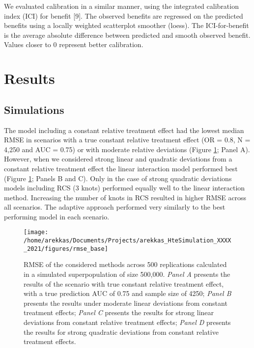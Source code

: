 \documentclass{article}
\begin{document}
We evaluated calibration in a similar manner, using the integrated
calibration index (ICI) for benefit {[}9{]}. The observed benefits are
regressed on the predicted benefits using a locally weighted scatterplot
smoother (loess). The ICI-for-benefit is the average absolute difference
between predicted and smooth observed benefit. Values closer to \(0\)
represent better calibration.

\hypertarget{results}{%
\section{Results}\label{results}}

\hypertarget{simulations}{%
\subsection{Simulations}\label{simulations}}

The model including a constant relative treatment effect had the lowest
median RMSE in scenarios with a true constant relative treatment effect
(OR = 0.8, N = 4,250 and AUC = 0.75) or with moderate relative
deviations (Figure \ref{fig:rmsebase}; Panel A). However, when we
considered strong linear and quadratic deviations from a constant
relative treatment effect the linear interaction model performed best
(Figure \ref{fig:rmsebase}; Panels B and C). Only in the case of strong
quadratic deviations models including RCS (3 knots) performed equally
well to the linear interaction method. Increasing the number of knots in
RCS resulted in higher RMSE across all scenarios. The adaptive approach
performed very similarly to the best performing model in each scenario.

\begin{figure}
\texttt{[image: /home/arekkas/Documents/Projects/arekkas\_HteSimulation\_XXXX\_2021/figures/rmse\_base]} \caption{RMSE of the considered methods across 500 replications calculated in a simulated superpopulation of size 500,000. \textit{Panel A} presents the results of the scenario with true constant relative treatment effect, with a true prediction AUC of 0.75 and sample size of 4250; \textit{Panel B} presents the results under moderate linear deviations from constant treatment effects; \textit{Panel C} presents the results for strong linear deviations from constant relative treatment effects; \textit{Panel D} presents the results for strong quadratic deviations from constant relative treatment effects.}\label{fig:rmsebase}
\end{figure}
\end{document}
